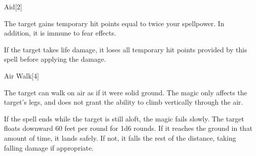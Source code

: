 \begin{spellsection}{Aid}[2]
    \begin{spellheader}
    \end{spellheader}
    \begin{spellcontent}
        \begin{spelltargetinginfo}
        \end{spelltargetinginfo}
        \begin{spelleffects}
            \spelleffect The target gains temporary hit points equal to twice your spellpower. In addition, it is immune to fear effects.
            \spelldur \durpersonallong
        \end{spelleffects}
    \end{spellcontent}
    \begin{spellfooter}
        \spellnotes If the target takes life damage, it loses all temporary hit points provided by this spell before applying the damage.
        \miscastexplode
    \end{spellfooter}
    \begin{spellaugments}
    \end{spellaugments}
\end{spellsection}

\begin{spellsection}{Air Walk}[4]
    \begin{spellheader}
    \end{spellheader}
    \begin{spellcontent}
        \begin{spelltargetinginfo}
        \end{spelltargetinginfo}
        \begin{spelleffects}
            \spelleffect The target can walk on air as if it were solid ground. The magic only affects the target's legs, and does not grant the ability to climb vertically through the air.
            \par If the spell ends while the target is still aloft, the magic fails slowly. The target floats downward 60 feet per round for 1d6 rounds. If it reaches the ground in that amount of time, it lands safely. If not, it falls the rest of the distance, taking falling damage if appropriate.
            \spelldur \durshort
        \end{spelleffects}
    \end{spellcontent}
    \begin{spellfooter}
        \miscastexplode
    \end{spellfooter}
\end{spellsection}


